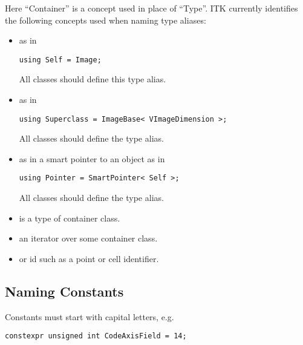 Here ``Container'' is a concept used in place of ``Type''. ITK currently
identifies the following concepts used when naming type aliases:

\begin{itemize}
\item \textbf{} as in

\small
\begin{verbatim}
using Self = Image;
\end{verbatim}
\normalsize

All classes should define this type alias.
\item \textbf{} as in

\small
\begin{verbatim}
using Superclass = ImageBase< VImageDimension >;
\end{verbatim}
\normalsize

All classes should define the  type alias.
\item \textbf{} as in a smart pointer to an object as in

\begin{verbatim}
using Pointer = SmartPointer< Self >;
\end{verbatim}
\normalsize

All classes should define the  type alias.
\item \textbf{} is a type of container class.
\item \textbf{} an iterator over some container class.
\item \textbf{} or id such as a point or cell identifier.
\end{itemize}


\subsection{Naming Constants}
\label{subsec:NamingConstants}

Constants must start with capital letters, e.g.

\small
\begin{verbatim}
constexpr unsigned int CodeAxisField = 14;
\end{verbatim}
\normalsize


